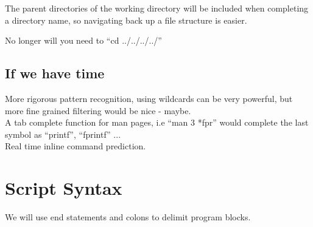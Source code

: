 \documentclass[a4paper,12pt]{article}
\begin{document}
The parent directories of the working directory will be included when completing a directory name, so navigating back up a file structure is easier.

No longer will you need to ``cd ../../../../''

\subsection*{If we have time}
More rigorous pattern recognition, using wildcards can be very powerful, but more fine grained filtering would be nice - maybe.\\[0.5cm]
A tab complete function for man pages, i.e ``man 3 *fpr'' would complete the last symbol as ``printf'',  ``fprintf'' ...\\[0.5cm]
Real time inline command prediction.

\pagebreak
\section*{Script Syntax}

We will use end statements and colons to delimit program blocks.
\end{document}

